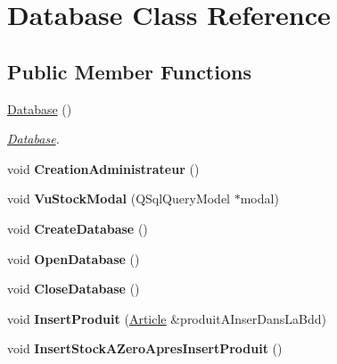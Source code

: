 \hypertarget{class_database}{}\section{Database Class Reference}
\label{class_database}
\subsection*{Public Member Functions}
\begin{DoxyCompactItemize}
\item 
\mbox{\label{class_database_a4703c80e6969d33565ea340f768fdadf}} 
\mbox{\hyperlink{class_database_a4703c80e6969d33565ea340f768fdadf}{Database}} ()
\begin{DoxyCompactList}\small\item\em \mbox{\hyperlink{class_database}{Database}}. \end{DoxyCompactList}\item 
\mbox{\label{class_database_a1c9bb35096041517d19d9ad4a165a271}} 
void {\bfseries Creation\+Administrateur} ()
\item 
\mbox{\label{class_database_aa27438ff72eb9d7b314538fe01808ba6}} 
void {\bfseries Vu\+Stock\+Modal} (Q\+Sql\+Query\+Model $\ast$modal)
\item 
\mbox{\label{class_database_a832119560d0d28b759930f0e25b6d58c}} 
void {\bfseries Create\+Database} ()
\item 
\mbox{\label{class_database_ab9dd492fa985aab34f9994a0c0eaf09e}} 
void {\bfseries Open\+Database} ()
\item 
\mbox{\label{class_database_ab5f6aae31ad0d80f5b0469237ba28421}} 
void {\bfseries Close\+Database} ()
\item 
\mbox{\label{class_database_a876113e6495199697973a3820d72c744}} 
void {\bfseries Insert\+Produit} (\mbox{\hyperlink{class_article}{Article}} \&produit\+A\+Inser\+Dans\+La\+Bdd)
\item 
\mbox{\label{class_database_ac37e765bc5bf40dd4610e3a7a6aa997f}} 
void {\bfseries Insert\+Stock\+A\+Zero\+Apres\+Insert\+Produit} ()

\end{DoxyCompactItemize}
